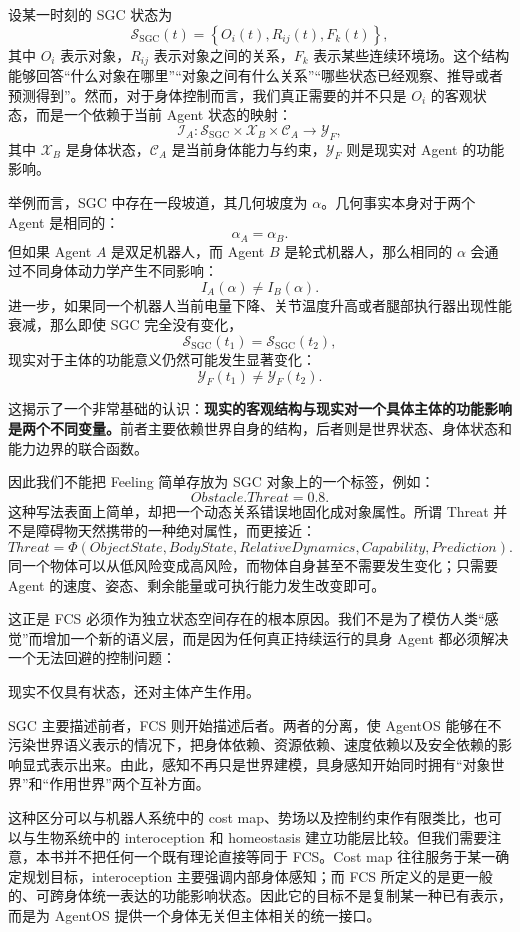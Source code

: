 设某一时刻的 SGC 状态为
\[
\mathcal{S}_{\mathrm{SGC}}(t)
=
\left\{
O_i(t),R_{ij}(t),F_k(t)
\right\},
\]
其中 $O_i$ 表示对象，$R_{ij}$ 表示对象之间的关系，$F_k$ 表示某些连续环境场。这个结构能够回答“什么对象在哪里”“对象之间有什么关系”“哪些状态已经观察、推导或者预测得到”。然而，对于身体控制而言，我们真正需要的并不只是 $O_i$ 的客观状态，而是一个依赖于当前 Agent 状态的映射：
\[
\mathcal I_A:
\mathcal S_{\mathrm{SGC}}
\times
\mathcal X_B
\times
\mathcal C_A
\longrightarrow
\mathcal Y_F,
\]
其中 $\mathcal X_B$ 是身体状态，$\mathcal C_A$ 是当前身体能力与约束，$\mathcal Y_F$ 则是现实对 Agent 的功能影响。

举例而言，SGC 中存在一段坡道，其几何坡度为 $\alpha$。几何事实本身对于两个 Agent 是相同的：
\[
\alpha_A=\alpha_B.
\]
但如果 Agent $A$ 是双足机器人，而 Agent $B$ 是轮式机器人，那么相同的 $\alpha$ 会通过不同身体动力学产生不同影响：
\[
I_A(\alpha)\neq I_B(\alpha).
\]
进一步，如果同一个机器人当前电量下降、关节温度升高或者腿部执行器出现性能衰减，那么即使 SGC 完全没有变化，
\[
\mathcal S_{\mathrm{SGC}}(t_1)
=
\mathcal S_{\mathrm{SGC}}(t_2),
\]
现实对于主体的功能意义仍然可能发生显著变化：
\[
\mathcal Y_F(t_1)\neq\mathcal Y_F(t_2).
\]

这揭示了一个非常基础的认识：\textbf{现实的客观结构与现实对一个具体主体的功能影响是两个不同变量。}前者主要依赖世界自身的结构，后者则是世界状态、身体状态和能力边界的联合函数。

因此我们不能把 Feeling 简单存放为 SGC 对象上的一个标签，例如：
\[
Obstacle.Threat=0.8.
\]
这种写法表面上简单，却把一个动态关系错误地固化成对象属性。所谓 Threat 并不是障碍物天然携带的一种绝对属性，而更接近：
\[
Threat
=
\Phi
(
ObjectState,
BodyState,
RelativeDynamics,
Capability,
Prediction
).
\]
同一个物体可以从低风险变成高风险，而物体自身甚至不需要发生变化；只需要 Agent 的速度、姿态、剩余能量或可执行能力发生改变即可。

这正是 FCS 必须作为独立状态空间存在的根本原因。我们不是为了模仿人类“感觉”而增加一个新的语义层，而是因为任何真正持续运行的具身 Agent 都必须解决一个无法回避的控制问题：

\begin{statementbox}
现实不仅具有状态，还对主体产生作用。
\end{statementbox}

SGC 主要描述前者，FCS 则开始描述后者。两者的分离，使 AgentOS 能够在不污染世界语义表示的情况下，把身体依赖、资源依赖、速度依赖以及安全依赖的影响显式表示出来。由此，感知不再只是世界建模，具身感知开始同时拥有“对象世界”和“作用世界”两个互补方面。

这种区分可以与机器人系统中的 cost map、势场以及控制约束作有限类比，也可以与生物系统中的 interoception 和 homeostasis 建立功能层比较。但我们需要注意，本书并不把任何一个既有理论直接等同于 FCS。Cost map 往往服务于某一确定规划目标，interoception 主要强调内部身体感知；而 FCS 所定义的是更一般的、可跨身体统一表达的功能影响状态。因此它的目标不是复制某一种已有表示，而是为 AgentOS 提供一个身体无关但主体相关的统一接口。

